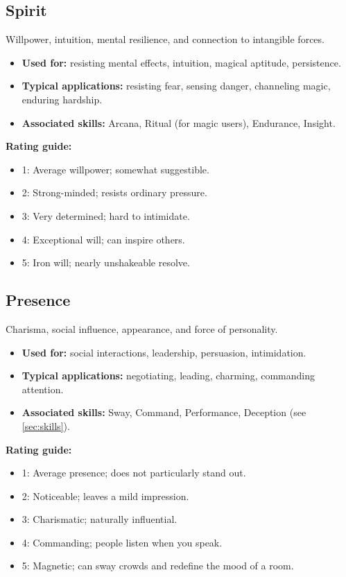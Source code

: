 \subsection{Spirit}
\label{sec:attribute-spirit}
Willpower, intuition, mental resilience, and connection to intangible forces.
\begin{itemize}
  \item \textbf{Used for:} resisting mental effects, intuition, magical aptitude, persistence.
  \item \textbf{Typical applications:} resisting fear, sensing danger, channeling magic, enduring hardship.
  \item \textbf{Associated skills:} Arcana, Ritual (for magic users), Endurance, Insight.
\end{itemize}
\textbf{Rating guide:}
\begin{itemize}
  \item 1: Average willpower; somewhat suggestible.
  \item 2: Strong-minded; resists ordinary pressure.
  \item 3: Very determined; hard to intimidate.
  \item 4: Exceptional will; can inspire others.
  \item 5: Iron will; nearly unshakeable resolve.
\end{itemize}

\subsection{Presence}
\label{sec:attribute-presence}
Charisma, social influence, appearance, and force of personality.
\begin{itemize}
  \item \textbf{Used for:} social interactions, leadership, persuasion, intimidation.
  \item \textbf{Typical applications:} negotiating, leading, charming, commanding attention.
  \item \textbf{Associated skills:} Sway, Command, Performance, Deception (see \ref{sec:skills}).
\end{itemize}
\textbf{Rating guide:}
\begin{itemize}
  \item 1: Average presence; does not particularly stand out.
  \item 2: Noticeable; leaves a mild impression.
  \item 3: Charismatic; naturally influential.
  \item 4: Commanding; people listen when you speak.
  \item 5: Magnetic; can sway crowds and redefine the mood of a room.
\end{itemize}

